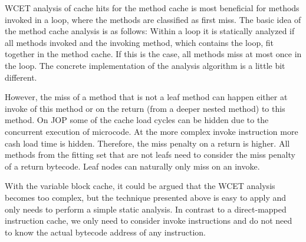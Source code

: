 WCET analysis of cache hits for the method cache is most beneficial
for methods invoked in a loop, where the methods are classified as
first miss. The basic idea of the method cache analysis is as
follows: Within a loop it is statically analyzed if all methods
invoked and the invoking method, which contains the loop, fit
together in the method cache. If this is the case, all methods miss
at most once in the loop. The concrete implementation of the analysis
algorithm is a little bit different.

However, the miss of a method that is not a leaf method can happen
either at invoke of this method or on the return (from a deeper
nested method) to this method. On JOP some of the cache load cycles
can be hidden due to the concurrent execution of microcode. At the
more complex invoke instruction more cash load time is hidden.
Therefore, the miss penalty on a return is higher. All methods from
the fitting set that are not leafs need to consider the miss penalty
of a return bytecode. Leaf nodes can naturally only miss on an
invoke.

With the variable block cache, it could be argued that the WCET
analysis becomes too complex, but the technique presented above is
easy to apply and only needs to perform a simple static analysis. In
contrast to a direct-mapped instruction cache, we only need to
consider invoke instructions and do not need to know the actual
bytecode address of any instruction.


%
%
%
%

